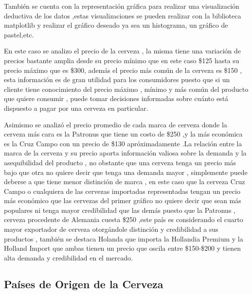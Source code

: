 \documentclass[twocolumn,12pt]{article}
\begin{document}
También se cuenta con la representación gráfica para realizar una  visualización deductiva de los datos ,estas visualizaciones se pueden realizar con la biblioteca matplotlib y realizar el gráfico deseado ya sea un histograma, un gráfico de pastel,etc.

En este caso se analizo el precio de la cerveza , la misma tiene una variación de precios bastante amplia desde su precio mínimo que en este caso \$125 hasta su precio máximo que es \$300, además el precio más común de la cerveza es \$150 , esta información es de gran utilidad para los consumidores puesto que si un cliente tiene conocimiento del precio máximo , mínimo y más común del producto que quiere consumir , puede tomar decisiones informadas sobre cuánto está dispuesto a pagar por una cerveza en particular.

Asimismo se analizó el precio promedio de cada marca de cerveza donde la cerveza más cara es la Patronus que tiene un costo de \$250 ,y la más económica es la Cruz Campo con un precio de \$130 apróximadamente .La relación entre la marca de la cerveza y su precio aporta información valiosa sobre la demanda y la asequibilidad del producto , no obstante que una cerveza tenga un precio más bajo que otra no quiere decir que tenga una demanda mayor , simplemente puede deberse a que tiene menor distinción de marca , en este caso que la cerveza Cruz Campo o cualquiera de las cervezas importadas representadas  tengan un precio más económico que las cervezas del primer gráfico no quiere decir que sean más populares ni tenga mayor credibilidad que las demás puesto que la Patronus , cerveza procedente de Alemania cuesta \$250 ,este país es considerando el cuarto mayor exportador de cerveza otorgándole distinción y credibilidad a sus productos , también se destaca Holanda que importa la Hollandia Premium y la Holland Import que ambas tienen un precio que oscila entre \$150-\$200 y tienen alta demanda y credibilidad en el mercado.



\subsection{Países de Origen de la Cerveza}
\end{document}
